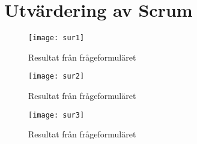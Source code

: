 \section{Utvärdering  av Scrum}
\label{Leypendix}
\begin{figure*}[h]
	\centering
	\texttt{[image: sur1]}
	\caption{Resultat från frågeformuläret}
	\label{q1}
\end{figure*}
\newpage
\begin{figure*}[h]
	\centering
	\texttt{[image: sur2]}
	\caption{Resultat från frågeformuläret}
	\label{q1}
\end{figure*}
\newpage
\begin{figure*}[h]
	\centering
	\texttt{[image: sur3]}
	\caption{Resultat från frågeformuläret}
	\label{q1}
\end{figure*}